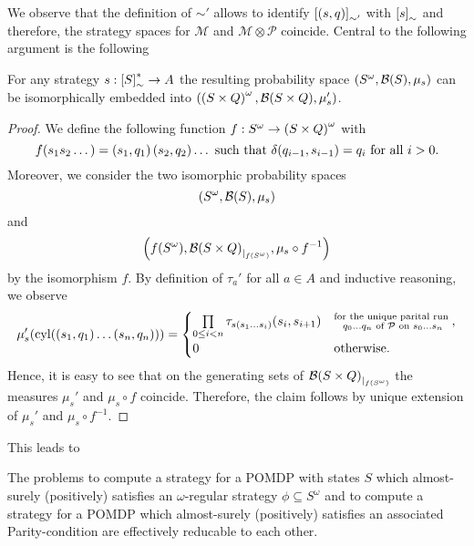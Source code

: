 We observe that the definition of $\sim'$ allows to identify
$\left[\left(s,q\right)\right]_{\sim'}$ with $\left[s\right]_{\sim}$ and therefore, the
strategy spaces for $\mathcal{M}$ and $\mathcal{M}\otimes\mathcal{P}$ coincide.
Central to the following argument is the following
\begin{lemma}
  For any strategy $s:\left[S\right]_{\sim}^{*}\rightarrow A$ the resulting
  probability space $\left(S^{\omega}, \mathcal{B}(S), \mu_{s}\right)$ can be
  isomorphically embedded into 
  $\left(\left(S\times Q\right)^{\omega}, \mathcal{B}(S\times Q), \mu_{s}'\right)$.
  \label{lem:embedphiintopomdp}
\end{lemma}
\begin{proof}
  We define the following function $f:S^{\omega}\rightarrow
  \left(S\times Q\right)^{\omega}$ with
  \begin{equation*}
    f(s_{1}s_{2}\dots) = \left(s_{1}, q_{1}\right)\left(s_{2}, q_{2}\right)\dots
    \text{ such that }
    \delta(q_{i-1}, s_{i-1}) = q_{i}\text{ for all }i>0.
  \end{equation*}
  Moreover, we consider the two isomorphic probability spaces
  \begin{equation*}
    \left(S^{\omega}, \mathcal{B}(S), \mu_{s}\right)
  \end{equation*} and 
  \begin{equation*}
    \left(f(S^{\omega}), {\mathcal{B}(S\times Q)}_{|_{f(S^{\omega})}},
      \mu_{s}\circ f^{-1}\right)
  \end{equation*}
  by the isomorphism $f$. By definition of $\tau_{a}'$ for
  all $a\in A$ and inductive reasoning, we observe
  \begin{equation*}
    \mu_{s}'(\operatorname{cyl}(\left(s_{1}, q_{1}\right)\dots\left(s_{n}, q_{n}\right))) = 
    \begin{cases}
      \prod\limits_{0\leq i<n}\tau_{s(s_{1}\dots s_{i})}(s_{i}, s_{i+1})
        &\substack{\text{for the unique parital run }\\q_{0}\dots q_{n}
          \text{ of }\mathcal{P}\text{ on }s_{0}\dots s_{n}},\\
      0&\text{otherwise}.
    \end{cases}
  \end{equation*}
  Hence, it is easy to see that on the generating sets of
  ${\mathcal{B}(S\times Q)}_{|_{f(S^{\omega})}}$ the measures $\mu_{s}'$
  and $\mu_{s}\circ f$ coincide. Therefore, the claim follows by unique
  extension of $\mu_{s}'$ and $\mu_{s}\circ f^{-1}$.
\end{proof}
This leads to
\begin{theorem}
  The problems to compute a strategy for a \ac{POMDP} with states $S$ which
  almost-surely (positively) satisfies an $\omega$-regular strategy
  $\phi\subseteq S^{\omega}$ and to compute a strategy for a \ac{POMDP} which
  almost-surely (positively) satisfies an associated Parity-condition are
  effectively reducable to each other.
  \label{thm:POMDPomegareg}
\end{theorem}

